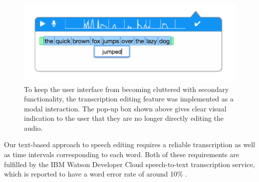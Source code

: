 \begin{figure}
	\centering
	\includegraphics[width=\columnwidth,keepaspectratio]{figures/transcription_edit}
	\caption{To keep the user interface from becoming cluttered with secondary functionality, the transcription editing feature was implemented as a modal interaction. The pop-up box shown above gives clear visual indication to the user that they are no longer directly editing the audio.}
	\label{fig:transcription}
\end{figure}


Our text-based approach to speech editing requires a reliable transcription as well as time intervals corresponding to each word.
Both of these requirements are fulfilled by the IBM Watson Developer Cloud speech-to-text transcription service, which is reported to have a word error rate of around 10\% \cite{soltau:2014}.
